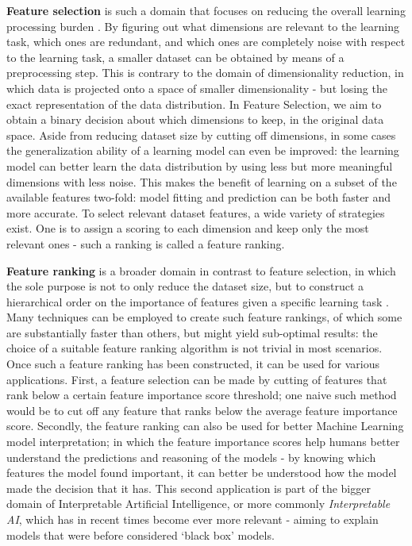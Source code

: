 \documentclass{article}
\begin{document}
\textbf{Feature selection} is such a domain that focuses on reducing the overall learning processing burden \citep{guyon_introduction_2003}. By figuring out what dimensions are relevant to the learning task, which ones are redundant, and which ones are completely noise with respect to the learning task, a smaller dataset can be obtained by means of a preprocessing step. This is contrary to the domain of dimensionality reduction, in which data is projected onto a space of smaller dimensionality - but losing the exact representation of the data distribution. In Feature Selection, we aim to obtain a binary decision about which dimensions to keep, in the original data space. Aside from reducing dataset size by cutting off dimensions, in some cases the generalization ability of a learning model can even be improved: the learning model can better learn the data distribution by using less but more meaningful dimensions with less noise. This makes the benefit of learning on a subset of the available features two-fold: model fitting and prediction can be both faster and more accurate. To select relevant dataset features, a wide variety of strategies exist. One is to assign a scoring to each dimension and keep only the most relevant ones - such a ranking is called a feature ranking.

\textbf{Feature ranking} is a broader domain in contrast to feature selection, in which the sole purpose is not to only reduce the dataset size, but to construct a hierarchical order on the importance of features given a specific learning task \citep{duch_comparison_2004}. Many techniques can be employed to create such feature rankings, of which some are substantially faster than others, but might yield sub-optimal results: the choice of a suitable feature ranking algorithm is not trivial in most scenarios. Once such a feature ranking has been constructed, it can be used for various applications. First, a feature selection can be made by cutting of features that rank below a certain feature importance score threshold; one naive such method would be to cut off any feature that ranks below the average feature importance score. Secondly, the feature ranking can also be used for better Machine Learning model interpretation; in which the feature importance scores help humans better understand the predictions and reasoning of the models - by knowing which features the model found important, it can better be understood how the model made the decision that it has. This second application is part of the bigger domain of Interpretable Artificial Intelligence, or more commonly \textit{Interpretable AI}, which has in recent times become ever more relevant \citep{ghosh_interpretable_2020} - aiming to explain models that were before considered `black box' models.
\end{document}
